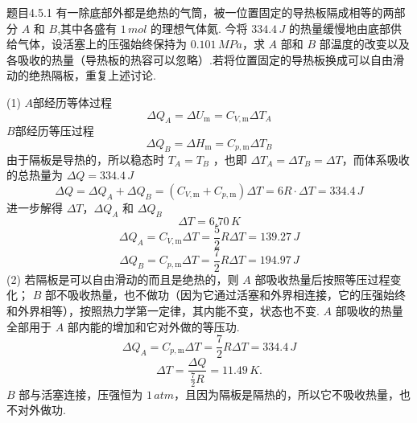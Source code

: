 \begin{question}{题目4.5.1}
    有一除底部外都是绝热的气筒，被一位置固定的导热板隔成相等的两部分 $A$ 和 $B$,其中各盛有 $1 \,\si{mol}$ 的理想气体氮. 今将 $334.4\,\si{J}$ 的热量缓慢地由底部供给气体，设活塞上的压强始终保持为 $0.101 \,\si{MPa}$，求 $A$ 部和 $B$ 部温度的改变以及各吸收的热量（导热板的热容可以忽略）.若将位置固定的导热板换成可以自由滑动的绝热隔板，重复上述讨论.
\end{question}
\begin{solution}
    (1) $A$部经历等体过程
    $$
        \Delta Q_A = \Delta U_\mathrm{m} = C_{V,\mathrm{m}}\Delta{T_A}
    $$
    $B$部经历等压过程
    $$
        \Delta Q_B = \Delta H_\mathrm{m} = C_{p,\mathrm{m}}\Delta{T_B}
    $$
    由于隔板是导热的，所以稳态时 $T_A = T_B$ ，也即 $\Delta T_A = \Delta T_B = \Delta T$，而体系吸收的总热量为 $\Delta Q = 334.4 \,\si{J}$
    $$
        \Delta Q = \Delta{Q_A} + \Delta{Q_B}
        = (C_{V,\mathrm{m}} + C_{p,\mathrm{m}})\Delta{T}
        = 6R \cdot \Delta{T}
        = 334.4 \,\si{J}
    $$
    进一步解得 $\Delta T$，$\Delta Q_A$ 和 $\Delta Q_B$
    $$
        \Delta T = 6.70 \,\si{K}
    $$
    $$
        \Delta Q_A = C_{V,\mathrm{m}}\Delta{T} = \frac{5}{2}R\Delta{T} = 139.27 \,\si{J}
    $$
    $$
        \Delta Q_B = C_{p,\mathrm{m}}\Delta{T} = \frac{7}{2}R\Delta{T} = 194.97 \,\si{J}
    $$
    (2) 若隔板是可以自由滑动的而且是绝热的，则 $A$ 部吸收热量后按照等压过程变化； $B$ 部不吸收热量，也不做功（因为它通过活塞和外界相连接，它的压强始终和外界相等），按照热力学第一定律，其内能不变，状态也不变. $A$ 部吸收的热量全部用于 $A$ 部内能的增加和它对外做的等压功.
    $$
        \Delta Q_A = C_{p,\mathrm{m}} \Delta{T}
        = \frac{7}{2}R\Delta{T} = 334.4 \,\si{J}
    $$
    $$
        \Delta T = \frac{\Delta Q}{\frac{7}{2}R}
        = 11.49 \,\si{K}.
    $$
    $B$ 部与活塞连接，压强恒为 $1 \,\si{atm}$，且因为隔板是隔热的，所以它不吸收热量，也不对外做功.
\end{solution}

